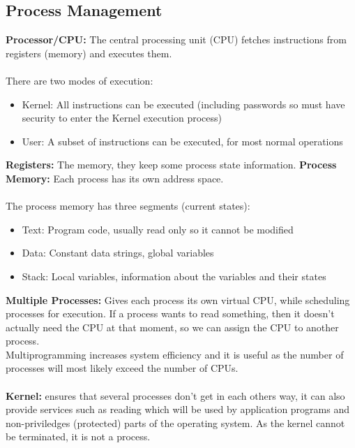 \documentclass[a4paper,10pt]{article}
\begin{document}
\subsection{Process Management}
\textcolor{WildStrawberry}{\textbf{Processor/CPU:}} The central processing unit (CPU) fetches instructions from registers (memory) and executes them. \\\\
There are two modes of execution: 
\renewcommand{\labelitemi}{\textperiodcentered}
\begin{itemize}
\item \textcolor{WildStrawberry}{Kernel:} All instructions can be executed (including passwords so must have security to enter the Kernel execution process)
\item \textcolor{WildStrawberry}{User:} A subset of instructions can be executed, for most normal operations
\end{itemize}
\textcolor{WildStrawberry}{\textbf{Registers:}} The memory, they keep some process state information. 
\textcolor{WildStrawberry}{\textbf{Process Memory:}} Each process has its own address space. \\\\
The process memory has three segments (current states): 
\begin{itemize}
\item \textcolor{WildStrawberry}{Text:} Program code, usually read only so it cannot be modified 
\item \textcolor{WildStrawberry}{Data:} Constant data strings, global variables 
\item \textcolor{WildStrawberry}{Stack:} Local variables, information about the variables and their states \\
\end{itemize}
\textcolor{WildStrawberry}{\textbf{Multiple Processes:}} Gives each process its own virtual CPU, while scheduling processes for execution. If a process wants to read something, then it doesn't actually need the CPU at that moment, so we can assign the CPU to another process. \\
Multiprogramming increases system efficiency and it is useful as the number of processes will most likely exceed the number of CPUs. \\\\
\textcolor{WildStrawberry}{\textbf{Kernel:}} ensures that several processes don't get in each others way, it can also provide services such as reading which will be used by application programs and non-priviledges (protected) parts of the operating system. As the kernel cannot be terminated, it is not a process. \\\\
\end{document}
